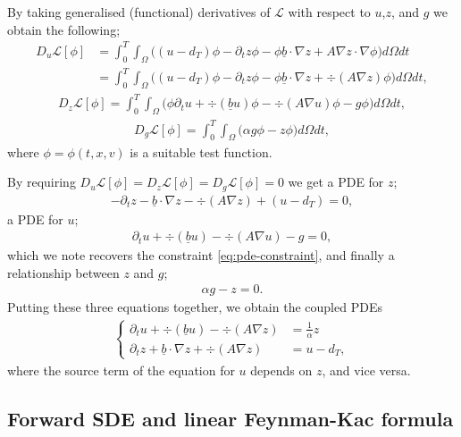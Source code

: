 \documentclass{article}  %
\begin{document}
By taking generalised (functional) derivatives of $\mathcal{L}$ with respect to $u$,$z$, and $g$ we obtain the following;
%
\begin{align} 
    D_u \mathcal{L}[\phi] &= \int_{0}^{T} \int_{\Omega} \Big((u-d_T)\phi - \partial_t z \phi - \phi \underline{b}\cdot\nabla z + A \nabla z \cdot \nabla \phi \Big) d\Omega dt\\
    &= \int_{0}^{T} \int_{\Omega} \Big((u-d_T)\phi - \partial_t z \phi - \phi \underline{b}\cdot\nabla z + \div{(A \nabla z)} \phi \Big) d\Omega dt,
\end{align}
%
\begin{align} 
    D_z\mathcal{L}[\phi] = \int_{0}^{T} \int_{\Omega} \Big( \phi \partial_t u + \div{(\underline{b}u)} \phi - \div{(A \nabla u)} \phi - g \phi \Big) d\Omega dt,
\end{align}
%
\begin{align} 
    D_g\mathcal{L}[\phi] = \int_{0}^{T} \int_{\Omega} \Big( \alpha g \phi - z \phi \Big) d\Omega dt,
\end{align}
%
where $\phi = \phi(t,x,v)$ is a suitable test function.

By requiring $D_u \mathcal{L}[\phi]=D_z \mathcal{L}[\phi]=D_g \mathcal{L}[\phi]=0$ we get a PDE for $z$;
%
\begin{align} 
    - \partial_t z - \underline{b} \cdot \nabla z - \div{(A \nabla z)} + (u - d_T) = 0,
\end{align}
% 
a PDE for $u$;
%
\begin{align} 
    \partial_t u + \div{(\underline{b}u)} - \div{(A \nabla u)} - g = 0,
\end{align}
%
which we note recovers the constraint \autoref{eq:pde-constraint}, and finally a relationship between $z$ and $g$;
%
\begin{align}
    \alpha g - z = 0. 
\end{align}
%
Putting these three equations together, we obtain the coupled PDEs 
%
\begin{align} 
    \begin{cases} 
        \partial_t u + \div{(\underline{b}u)} - \div{(A \nabla z)} &= \frac{1}{\alpha} z\\
        \partial_t z + \underline{b} \cdot \nabla z + \div{(A \nabla z)} &= u - d_T,
    \end{cases}
\end{align}
%
where the source term of the equation for $u$ depends on $z$, and vice versa.

\subsection{Forward SDE and linear Feynman-Kac formula}
\end{document}
